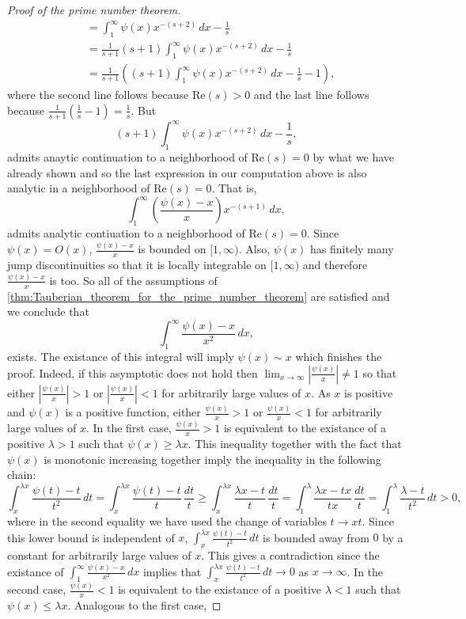 \documentclass[12pt]{book}
\theoremstyle{definition}\newframedtheorem{method}{Method}
\renewcommand{\l}{\lambda}
\newcommand{\<}{\langle}
\renewcommand{\>}{\rangle}
\renewcommand{\Re}{\mathrm{Re}}
\begin{document}
\begin{proof}[Proof of the prime number theorem]
\begin{align*}
          &= \int_{1}^{\infty}\psi(x)x^{-(s+2)}\,dx-\frac{1}{s} \\
          &= \frac{1}{s+1}(s+1)\int_{1}^{\infty}\psi(x)x^{-(s+2)}\,dx-\frac{1}{s} \\
          &= \frac{1}{s+1}\left((s+1)\int_{1}^{\infty}\psi(x)x^{-(s+2)}\,dx-\frac{1}{s}-1\right),
        \end{align*}
        where the second line follows because $\Re(s) > 0$ and the last line follows because $\frac{1}{s+1}\left(\frac{1}{s}-1\right) = \frac{1}{s}$. But
        \[
          (s+1)\int_{1}^{\infty}\psi(x)x^{-(s+2)}\,dx-\frac{1}{s},
        \]
        admits anaytic continuation to a neighborhood of $\Re(s) = 0$ by what we have already shown and so the last expression in our computation above is also analytic in a neighborhood of $\Re(s) = 0$. That is,
        \[
          \int_{1}^{\infty}\left(\frac{\psi(x)-x}{x}\right)x^{-(s+1)}\,dx,
        \]
        admits analytic contiuation to a neighborhood of $\Re(s) = 0$. Since $\psi(x) = O(x)$, $\frac{\psi(x)-x}{x}$ is bounded on $[1,\infty)$. Also, $\psi(x)$ has finitely many jump discontinuities so that it is locally integrable on $[1,\infty)$ and therefore $\frac{\psi(x)-x}{x}$ is too. So all of the assumptions of \cref{thm:Tauberian_theorem_for_the_prime_number_theorem} are satisfied and we conclude that
        \[
          \int_{1}^{\infty}\frac{\psi(x)-x}{x^{2}}\,dx,
        \]
        exists. The existance of this integral will imply $\psi(x) \sim x$ which finishes the proof. Indeed, if this asymptotic does not hold then $\lim_{x \to \infty}\left|\frac{\psi(x)}{x}\right| \neq 1$ so that either $\left|\frac{\psi(x)}{x}\right| > 1$ or $\left|\frac{\psi(x)}{x}\right| < 1$ for arbitrarily large values of $x$. As $x$ is positive and $\psi(x)$ is a positive function, either $\frac{\psi(x)}{x} > 1$ or $\frac{\psi(x)}{x} < 1$ for arbitrarily large values of $x$. In the first case, $\frac{\psi(x)}{x} > 1$ is equivalent to the existance of a positive $\l > 1$ such that $\psi(x) \ge \l x$. This inequality together with the fact that $\psi(x)$ is monotonic increasing together imply the inequality in the following chain:
        \[
          \int_{x}^{\l x}\frac{\psi(t)-t}{t^{2}}\,dt = \int_{x}^{\l x}\frac{\psi(t)-t}{t}\,\frac{dt}{t} \ge \int_{x}^{\l x}\frac{\l x-t}{t}\,\frac{dt}{t} = \int_{1}^{\l}\frac{\l x-tx}{tx}\,\frac{dt}{t} = \int_{1}^{\l}\frac{\l-t}{t^{2}}\,dt > 0,
        \]
        where in the second equality we have used the change of variables $t \to xt$. Since this lower bound is independent of $x$, $\int_{x}^{\l x}\frac{\psi(t)-t}{t^{2}}\,dt$ is bounded away from $0$ by a constant for arbitrarily large values of $x$. This gives a contradiction since the existance of $\int_{1}^{\infty}\frac{\psi(x)-x}{x^{2}}\,dx$ implies that $\int_{x}^{\l x}\frac{\psi(t)-t}{t^{2}}\,dt \to 0$ as $x \to \infty$. In the second case, $\frac{\psi(x)}{x} < 1$ is equivalent to the existance of a positive $\l < 1$ such that $\psi(x) \le \l x$. Analogous to the first case,

\end{proof}
\end{document}
